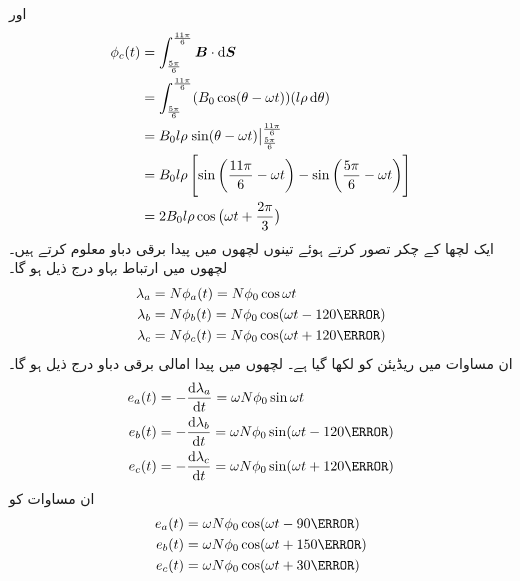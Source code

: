 اور
\begin{gather}
\begin{aligned}
\phi_c(t)&=\int_{\frac{5\pi}{6}}^{\frac{11\pi}{6}} \kvec{B} \cdot \dif \kvec{S}\\
&=\int_{\frac{5\pi}{6}}^{\frac{11\pi}{6}} (B_0 \cos (\theta-\omega t))(l \rho \dif \theta)\\
&=B_0 l \rho \left. \sin (\theta-\omega t) \right\vert_{\frac{5\pi}{6}}^{\frac{11\pi}{6}}\\
&=B_0 l \rho \left[\sin \left(\frac{11\pi}{6}-\omega t \right )-\sin \left (\frac{5\pi}{6}-\omega t \right) \right]\\
&=2 B_0 l \rho \cos \big(\omega t+\frac{2\pi}{3}\big)
\end{aligned}
\end{gather}
ایک لچھا کے  چکر تصور کرتے ہوئے تینوں لچھوں میں پیدا برقی دباو معلوم کرتے ہیں۔لچھوں میں ارتباط بہاو درج ذیل ہو گا۔
\begin{gather}
\begin{aligned}
\lambda_a&=N \phi_a (t)=N \phi_0 \cos \omega t\\
\lambda_b&=N \phi_b (t)=N \phi_0 \cos (\omega t-120\degree)\\
\lambda_c&=N \phi_c (t)=N \phi_0 \cos (\omega t+120\degree)
\end{aligned}
\end{gather}
ان مساوات میں  ریڈیئن کو  لکھا گیا ہے۔ لچھوں میں پیدا امالی برقی دباو درج ذیل ہو گا۔
\begin{gather}
\begin{aligned}\label{مساوات_گھومتے_مشین_تین_دور_سائن_نما_برقی_دباو_الف}
e_a(t)&=-\frac{\dif \lambda_a}{\dif t}=\omega N \phi_0 \sin \omega t\\
e_b(t)&=-\frac{\dif \lambda_b}{\dif t}=\omega N \phi_0 \sin (\omega t-120\degree)\\
e_c(t)&=-\frac{\dif \lambda_c}{\dif t}=\omega N \phi_0 \sin (\omega t+120\degree)
\end{aligned}
\end{gather}
ان مساوات کو 
\begin{gather}
\begin{aligned}\label{مساوات_گھومتے_مشین_تین_دور_سائن_نما_برقی_دباو}
e_a(t)&=\omega N \phi_0 \cos (\omega t -90\degree)\\
e_b(t)&=\omega N \phi_0 \cos (\omega t+150\degree)\\
e_c(t)&=\omega N \phi_0 \cos (\omega t+30\degree)
\end{aligned}
\end{gather}
